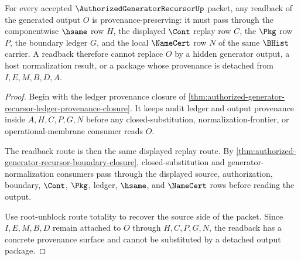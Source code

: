 \begin{theorem}
\label{thm:authorized-generator-recursor-readback-provenance-surface}
For every accepted $\AuthorizedGeneratorRecursorUp$ packet, any readback of the generated output $O$ is provenance-preserving: it must pass through the componentwise $\hsame$ row $H$, the displayed $\Cont$ replay row $C$, the $\Pkg$ row $P$, the boundary ledger $G$, and the local $\NameCert$ row $N$ of the same $\BHist$ carrier. A readback therefore cannot replace $O$ by a hidden generator output, a host normalization result, or a package whose provenance is detached from $I,E,M,B,D,A$.
\end{theorem}
\begin{proof}
Begin with the ledger provenance closure of \autoref{thm:authorized-generator-recursor-ledger-provenance-closure}. It keeps audit ledger and output provenance inside $A,H,C,P,G,N$ before any closed-substitution, normalization-frontier, or operational-membrane consumer reads $O$.

The readback route is then the same displayed replay route. By \autoref{thm:authorized-generator-recursor-boundary-closure}, closed-substitution and generator-normalization consumers pass through the displayed source, authorization, boundary, $\Cont$, $\Pkg$, ledger, $\hsame$, and $\NameCert$ rows before reading the output.

Use root-unblock route totality to recover the source side of the packet. Since $I,E,M,B,D$ remain attached to $O$ through $H,C,P,G,N$, the readback has a concrete provenance surface and cannot be substituted by a detached output package.
\end{proof}

